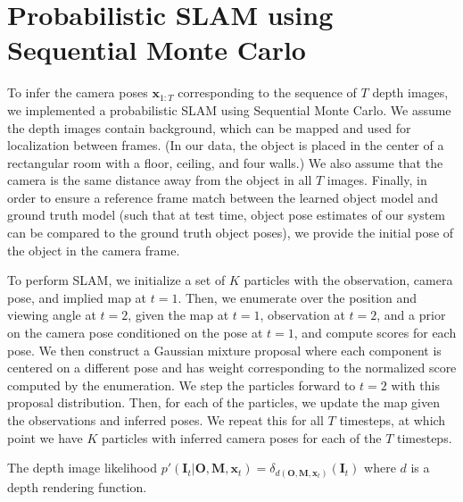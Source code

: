\section{Probabilistic SLAM using Sequential Monte Carlo}

To infer the camera poses $\mathbf{x}_{1:T}$ corresponding to the sequence of $T$ depth images, we implemented a probabilistic SLAM using Sequential Monte Carlo. We assume the depth images contain background, which can be mapped and used for localization between frames. (In our data, the object is placed in the center of a rectangular room with a floor, ceiling, and four walls.) We also assume that the camera is the same distance away from the object in all $T$ images. Finally, in order to ensure a reference frame match between the learned object model and ground truth model (such that at test time, object pose estimates of our system can be compared to the ground truth object poses), we provide the initial pose of the object in the camera frame.

To perform SLAM, we initialize a set of $K$ particles with the observation, camera pose, and implied map at $t=1$. Then, we enumerate over the position and viewing angle at $t=2$, given the map at $t=1$, observation at $t=2$, and a prior on the camera pose conditioned on the pose at $t=1$, and compute scores for each pose. We then construct a Gaussian mixture proposal where each component is centered on a different pose and has weight corresponding to the normalized score computed by the enumeration. We step the particles forward to $t=2$ with this proposal distribution. Then, for each of the particles, we update the map given the observations and inferred poses. We repeat this for all $T$ timesteps, at which point we have $K$ particles with inferred camera poses for each of the $T$ timesteps.

The depth image likelihood $p'(\mathbf{I}_t | \mathbf{O}, \mathbf{M}, \mathbf{x}_t) = \delta_{d(\mathbf{O}, \mathbf{M}, \mathbf{x}_t)}(\mathbf{I}_t)$ where $d$ is a depth rendering function.